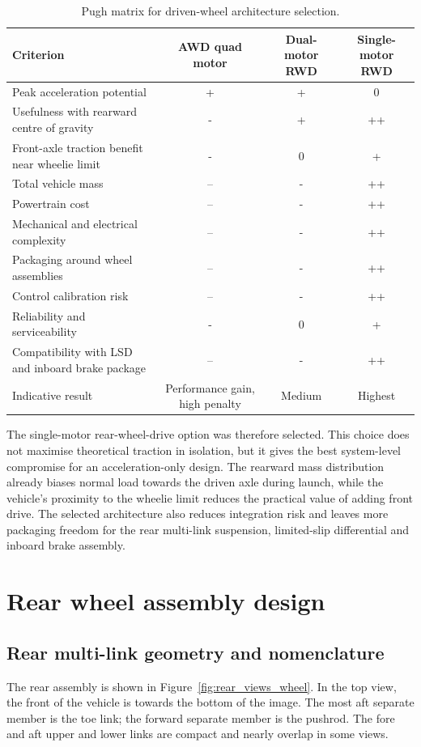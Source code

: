 \begin{table}[H]
\centering
\caption{Pugh matrix for driven-wheel architecture selection.}
\label{tab:pugh_drive_architecture}
\setlength{\tabcolsep}{3pt}
\begin{tabularx}{\linewidth}{|>{\raggedright\arraybackslash}X|c|c|c|}
\hline
\textbf{Criterion} & \textbf{AWD quad motor} & \textbf{Dual-motor RWD} & \textbf{Single-motor RWD} \\
\hline
Peak acceleration potential & + & + & 0 \\
\hline
Usefulness with rearward centre of gravity & - & + & ++ \\
\hline
Front-axle traction benefit near wheelie limit & - & 0 & + \\
\hline
Total vehicle mass & -- & - & ++ \\
\hline
Powertrain cost & -- & - & ++ \\
\hline
Mechanical and electrical complexity & -- & - & ++ \\
\hline
Packaging around wheel assemblies & -- & - & ++ \\
\hline
Control calibration risk & -- & - & ++ \\
\hline
Reliability and serviceability & - & 0 & + \\
\hline
Compatibility with LSD and inboard brake package & -- & - & ++ \\
\hline
Indicative result & Performance gain, high penalty & Medium & Highest \\
\hline
\end{tabularx}
\end{table}
\fi

The single-motor rear-wheel-drive option was therefore selected. This choice does not maximise theoretical traction in isolation, but it gives the best system-level compromise for an acceleration-only design. The rearward mass distribution already biases normal load towards the driven axle during launch, while the vehicle's proximity to the wheelie limit reduces the practical value of adding front drive. The selected architecture also reduces integration risk and leaves more packaging freedom for the rear multi-link suspension, limited-slip differential and inboard brake assembly.

\section{Rear wheel assembly design}

\subsection{Rear multi-link geometry and nomenclature}
The rear assembly is shown in Figure~\ref{fig:rear_views_wheel}. In the top view, the front of the vehicle is towards the bottom of the image. The most aft separate member is the toe link; the forward separate member is the pushrod. The fore and aft upper and lower links are compact and nearly overlap in some views.

